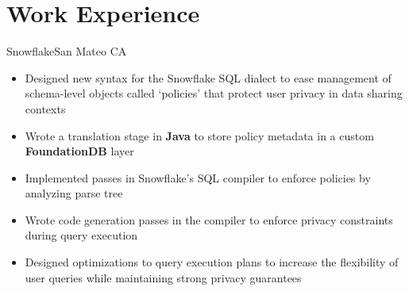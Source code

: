 \documentclass{moderncv}
\begin{document}
\makecvtitle
\begin{comment}
\section{Skills}
\begin{minipage}{0.25\textwidth}
    \begin{itemize}
        \item Reinforcement Learning
    \end{itemize}
\end{minipage}
    \begin{minipage}{0.25\textwidth}
    \begin{itemize}
        \item Reinforcement Learning
    \end{itemize}
\end{minipage}
\begin{minipage}{0.25\textwidth}
    \begin{itemize}
        \item Reinforcement Learning
    \end{itemize}
\end{minipage}
\begin{minipage}{0.25\textwidth}
    \begin{itemize}
        \item Reinforcement Learning
    \end{itemize}
\end{minipage}
\end{comment}
\section{Work Experience}

{Snowflake}{San Mateo CA}{}
{\begin{itemize}
    \item Designed new syntax for the Snowflake SQL dialect to ease management of schema-level objects called `policies' that protect user privacy in data sharing contexts %
    \item Wrote a translation stage in \textbf{Java} to store policy metadata in a custom \textbf{FoundationDB} layer %
    \item Implemented passes in Snowflake's SQL compiler to enforce policies by analyzing parse tree %
    \item Wrote code generation passes in the compiler to enforce privacy constraints during query execution %
    \item Designed optimizations to query execution plans to increase the flexibility of user queries while maintaining strong privacy guarantees %
\end{itemize}}
\end{document}
